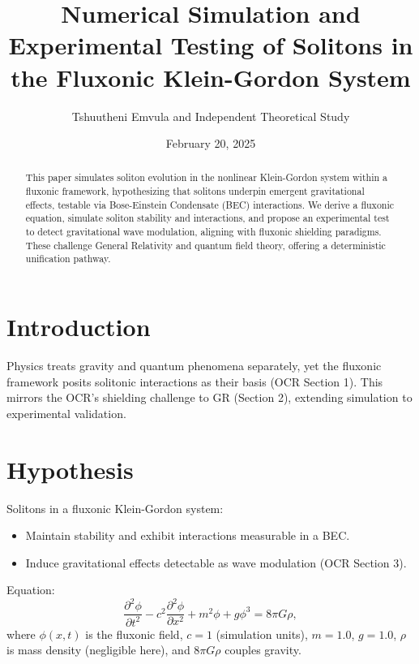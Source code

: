 \documentclass{article}
\title{Numerical Simulation and Experimental Testing of Solitons in the Fluxonic Klein-Gordon System}
\author{Tshuutheni Emvula and Independent Theoretical Study}
\date{February 20, 2025}
\begin{document}
\maketitle

\begin{abstract}
This paper simulates soliton evolution in the nonlinear Klein-Gordon system within a fluxonic framework, hypothesizing that solitons underpin emergent gravitational effects, testable via Bose-Einstein Condensate (BEC) interactions. We derive a fluxonic equation, simulate soliton stability and interactions, and propose an experimental test to detect gravitational wave modulation, aligning with fluxonic shielding paradigms. These challenge General Relativity and quantum field theory, offering a deterministic unification pathway.
\end{abstract}

\section{Introduction}
Physics treats gravity and quantum phenomena separately, yet the fluxonic framework posits solitonic interactions as their basis (OCR Section 1). This mirrors the OCR’s shielding challenge to GR (Section 2), extending simulation to experimental validation.

\section{Hypothesis}
Solitons in a fluxonic Klein-Gordon system:
\begin{itemize}
    \item Maintain stability and exhibit interactions measurable in a BEC.
    \item Induce gravitational effects detectable as wave modulation (OCR Section 3).
\end{itemize}
Equation:
\begin{equation}
\frac{\partial^2 \phi}{\partial t^2} - c^2 \frac{\partial^2 \phi}{\partial x^2} + m^2 \phi + g \phi^3 = 8 \pi G \rho,
\end{equation}
where \(\phi(x,t)\) is the fluxonic field, \(c = 1\) (simulation units), \(m = 1.0\), \(g = 1.0\), \(\rho\) is mass density (negligible here), and \(8 \pi G \rho\) couples gravity.
\end{document}
